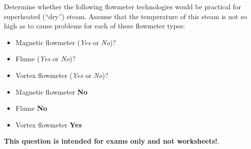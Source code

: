 

Determine whether the following flowmeter technologies would be practical for superheated (``dry'') steam.  Assume that the temperature of this steam is not so high as to cause problems for each of these flowmeter types:

\begin{itemize}
\item{} Magnetic flowmeter ({\it Yes} or {\it No})?
\vskip 10pt
\item{} Flume ({\it Yes} or {\it No})?
\vskip 10pt
\item{} Vortex flowmeter ({\it Yes} or {\it No})?
\end{itemize}







\begin{itemize}
\item{} Magnetic flowmeter {\bf No}
\item{} Flume {\bf No}
\item{} Vortex flowmeter {\bf Yes}
\end{itemize}







{\bf This question is intended for exams only and not worksheets!}.



